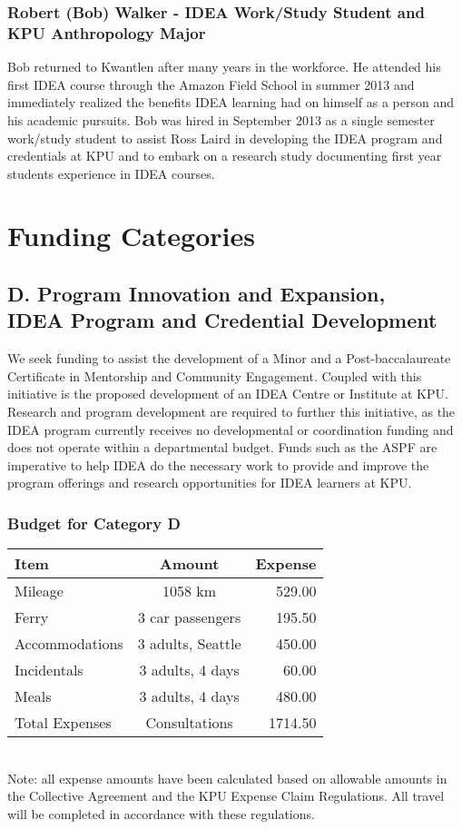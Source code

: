 \documentclass[11pt, letterpaper]{article}
\begin{document}
\subsubsection{Robert (Bob) Walker - IDEA Work/Study Student and KPU
Anthropology Major}

Bob returned to Kwantlen after many years in the workforce. He attended
his first IDEA course through the Amazon Field School in summer 2013 and
immediately realized the benefits IDEA learning had on himself as a
person and his academic pursuits. Bob was hired in September 2013 as a
single semester work/study student to assist Ross Laird in developing
the IDEA program and credentials at KPU and to embark on a research
study documenting first year students experience in IDEA courses.

\section{Funding Categories}

\subsection{D. Program Innovation and Expansion,\\
IDEA Program and Credential Development}

We seek funding to assist the development of a Minor and a Post-baccalaureate Certificate in Mentorship and Community Engagement.
Coupled with this initiative is the proposed development of an IDEA
Centre or Institute at KPU. Research and program development are
required to further this initiative, as the IDEA program currently
receives no developmental or coordination funding and does not operate
within a departmental budget. Funds such as the ASPF are imperative to
help IDEA do the necessary work to provide and improve the program
offerings and research opportunities for IDEA learners at KPU.

\subsubsection{Budget for Category D}


\begin{tabular}{|l|c|r|}
\hline
Item & Amount & Expense \\
\hline
Mileage & 1058 km & 529.00\\
Ferry & 3 car passengers & 195.50\\
Accommodations & 3 adults, Seattle & 450.00\\
Incidentals & 3 adults, 4 days & 60.00\\
Meals & 3 adults, 4 days & 480.00\\
\hline
Total Expenses & Consultations & 1714.50\\
\hline
\end{tabular}
\\[1em]
Note: all expense amounts have been calculated based on allowable amounts in the Collective Agreement and the KPU Expense Claim Regulations. All travel will be completed in accordance with these regulations.
\end{document}
